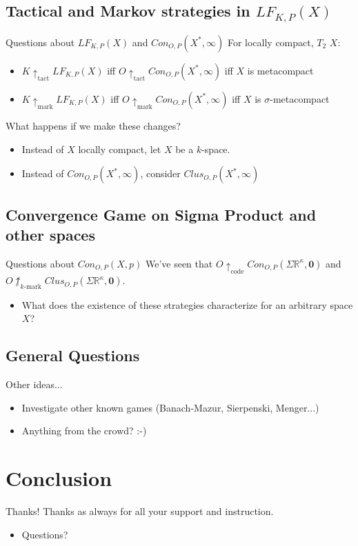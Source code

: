 \documentclass{beamer}
\newcommand{\markwin}{\uparrow_{\text{mark}}}
\newcommand{\tactwin}{\uparrow_{\text{tact}}}
\newcommand{\kmarkwin}[1]{\uparrow_{#1\text{-mark}}}
\newcommand{\codewin}{\uparrow_{\text{code}}}
\newcommand{\oneptcomp}[1]{#1^*}
\newcommand{\congame}[2]{Con_{O,P}(#1,#2)}
\newcommand{\clusgame}[2]{Clus_{O,P}(#1,#2)}
\newcommand{\lfkpgame}[1]{LF_{K,P}(#1)}
\newcommand{\sigmaprodr}[1]{\Sigma\mathbb{R}^{#1}}
\renewcommand{\vec}[1]{\mathbf{#1}}
\begin{document}
\subsection[Tactical and Markov strategies in $\lfkpgame{X}$]{Tactical and Markov strategies in $\lfkpgame{X}$}

\begin{frame}{Questions about $\lfkpgame{X}$ and $\congame{\oneptcomp{X}}{\infty}$}
For locally compact, $T_2$ $X$: 
\begin{itemize}
\item $K\tactwin\lfkpgame{X}$ iff $O\tactwin\congame{\oneptcomp{X}}{\infty}$ iff $X$ is metacompact
\item $K\markwin\lfkpgame{X}$ iff $O\markwin\congame{\oneptcomp{X}}{\infty}$ iff $X$ is $\sigma$-metacompact
\end{itemize}
\pause
What happens if we make these changes?
\pause
\begin{itemize}
\item Instead of $X$ locally compact, let $X$ be a $k$-space.
\pause
\item Instead of $\congame{\oneptcomp{X}}{\infty}$, consider $\clusgame{\oneptcomp{X}}{\infty}$
\end{itemize}
\end{frame}

\subsection[Convergence Game on Sigma Product and other spaces]{Convergence Game on Sigma Product and other spaces}

\begin{frame}{Questions about $\congame{X}{p}$}
We've seen that $O\codewin\congame{\sigmaprodr{\kappa}}{\vec{0}}$ and $O\not\kmarkwin{k}\clusgame{\sigmaprodr{\kappa}}{\vec{0}}$.
\pause
\begin{itemize}
\item What does the existence of these strategies characterize for an arbitrary space $X$?
\end{itemize}
\end{frame}

\subsection{General Questions}

\begin{frame}{Other ideas...}
\begin{itemize}
\item Investigate other known games (Banach-Mazur, Sierpenski, Menger...)
\pause
\item Anything from the crowd? :-)
\end{itemize}
\end{frame}

\section{Conclusion}

\begin{frame}{Thanks!}
Thanks as always for all your support and instruction.
\pause
\begin{itemize}
\item Questions?
\end{itemize}
\end{frame}
\end{document}
